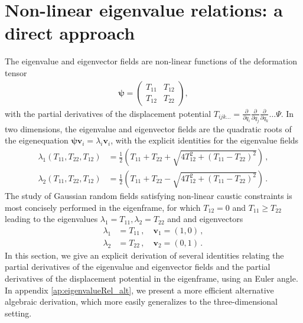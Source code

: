 \documentclass[a4paper, 11pt]{article}
\begin{document}
\section{Non-linear eigenvalue relations: a direct approach}\label{ap:eigenvalueRel}
The eigenvalue and eigenvector fields are non-linear functions of the deformation tensor
\begin{align}
\bm{\psi} = \begin{pmatrix} T_{11} & T_{12} \\ T_{12} & T_{22}\end{pmatrix},
\end{align}
with the partial derivatives of the displacement potential $T_{ijk\dots} = \frac{\partial}{\partial q_i}\frac{\partial}{\partial q_j}\frac{\partial}{\partial q_k}\dots \Psi$. In two dimensions, the eigenvalue and eigenvector fields are the quadratic roots of the eigenequation $\bm{\psi}\bm{v}_i=\lambda_i \bm{v}_i$, with the explicit identities for the eigenvalue fields
\begin{align}
\lambda_1(T_{11},T_{22},T_{12}) &= \frac{1}{2}\left(T_{11}+T_{22} + \sqrt{4 T_{12}^2 +(T_{11}-T_{22})^2}\right)\,,\label{eq:lambda_1}\\
\lambda_2(T_{11},T_{22},T_{12}) &= \frac{1}{2}\left(T_{11}+T_{22} - \sqrt{4 T_{12}^2 +(T_{11}-T_{22})^2}\right)\,.\label{eq:lambda_2}
\end{align}
The study of Gaussian random fields satisfying non-linear caustic constraints is most concisely performed in the eigenframe, for which $T_{12}=0$ and $T_{11} \geq T_{22}$ leading to the eigenvalues $\lambda_1=T_{11}, \lambda_2=T_{22}$ and and eigenvectors
\begin{align}
\lambda_{1} &= T_{11}\,,\quad \bm{v}_1=(1,0)\,,\\
\lambda_{2} &= T_{22}\,,\quad \bm{v}_2=(0,1)\,.
\end{align}
In this section, we give an explicit derivation of several identities relating the partial derivatives of the eigenvalue and eigenvector fields and the partial derivatives of the displacement potential in the eigenframe, using an Euler angle. In appendix \ref{ap:eigenvalueRel_alt}, we present a more efficient alternative algebraic derivation, which more easily generalizes to the three-dimensional setting.
\end{document}
